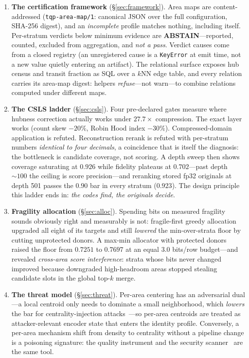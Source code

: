 \documentclass[sigconf, nonacm]{acmart}
\begin{document}
\begin{enumerate}
\item \textbf{The certification framework} (\S\ref{sec:framework}).
Area maps are content-addressed (\texttt{tqp-area-map/1}: canonical JSON
over the full configuration, SHA-256 digest), and an \emph{incomplete}
profile matches nothing, including itself. Per-stratum verdicts below
minimum evidence are \textbf{ABSTAIN}---reported, counted, excluded from
aggregation, and \emph{not a pass}. Verdict causes come from a closed
registry (an unregistered cause is a \texttt{KeyError} at emit time, not a
new value quietly entering an artifact). The relational surface exposes
hub census and transit fraction as SQL over a $k$NN edge table, and every
relation carries its area-map digest: helpers \emph{refuse}---not
warn---to combine relations computed under different maps.
\item \textbf{The CSLS ladder} (\S\ref{sec:csls}). Four pre-declared
gates measure where hubness correction actually works under $27.7\times$
compression. The exact layer works (count skew $-20\%$, Robin Hood index
$-30\%$). Compressed-domain application is refuted. Reconstruction rerank
is refuted with per-stratum numbers \emph{identical to four decimals}, a
coincidence that is itself the diagnosis: the bottleneck is candidate
coverage, not scoring. A depth sweep then shows coverage saturating at
$0.926$ while fidelity plateaus at $0.702$---past depth ${\sim}100$ the
ceiling is score precision---and reranking stored fp32 originals at depth
501 passes the $0.90$ bar in every stratum ($0.923$). The design
principle this ladder ends in: \emph{the codes find, the originals
decide}.
\item \textbf{Fragility allocation} (\S\ref{sec:alloc}). Spending bits on
measured fragility sounds obviously right and measurably is not:
fragile-first greedy allocation upgraded all eight of its targets and
still \emph{lowered} the min-over-strata floor by cutting unprotected
donors. A max-min allocator with protected donors raised the floor from
$0.7251$ to $0.7697$ at an equal $3.0$ bits/row budget---and revealed
\emph{cross-area score interference}: strata whose bits never changed
improved because downgraded high-headroom areas stopped stealing candidate
slots in the global top-$k$ merge.
\item \textbf{The threat model} (\S\ref{sec:threat}). Per-area centering
has an adversarial dual---a local centroid only needs to dominate a small
neighborhood, which \emph{lowers} the bar for centrality-injection
attacks~\cite{blackhole2026}---so per-area centroids are treated as
attacker-relevant encoder state that enters the identity profile.
Conversely, a per-area mechanism shift from density to centrality without
a pipeline change is a poisoning signature: the quality instrument and the
security scanner~\cite{advhubness2026} are the same tool.
\end{enumerate}
\end{document}
